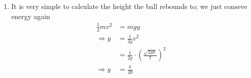 \begin{hint}
{\begin{enumerate}
\begin{align*}
\Rightarrow \frac{v}{u}&=\frac{6}{14}\pm\frac{8}{14} \\
\Rightarrow v&=-u \textrm{ or } v=u/7
\end{align*}
Since we initially defined $v$ as being upwards, in the opposite direction to $u$, the first solution corresponds to the particle continuing on at the same speed; this obviously conserves momentum and energy, but would mean that $\omega=0$ and the mass has passed straight through the windmill, so it is not the solution we are looking for. Using the other solution we can find what $\omega$ is:
\begin{align*}
u+v&=\frac{4}{3}\omega \\
\Rightarrow u+u/7&=\frac{4}{3}\omega \\
\Rightarrow \omega&=\frac{6}{7}u
\end{align*} 
we can also substitute a value in for $u$ since we know what height the mass started at (notice how leaving it as $u$ until this point makes the algebra much simpler)
\begin{align*}
mgh&=\frac{1}{2}mu^2 \\
\Rightarrow u&=\sqrt{2gh}
\end{align*}
and so our final expression for $\omega$ is
\begin{align*}
\omega=\frac{6\sqrt{2gh}}{7}
\end{align*} 
\item It is very simple to calculate the height the ball rebounds to; we just conseve energy again
\begin{align*}
\frac{1}{2}mv^2&=mgy \\
\Rightarrow y&=\frac{1}{2g}v^2 \\
&=\frac{1}{2g}\cdot\left(\frac{\sqrt{2gh}}{7}\right)^2 \\
\Rightarrow y&=\frac{h}{49}
\end{align*}
\end{enumerate}
}
\end{hint}